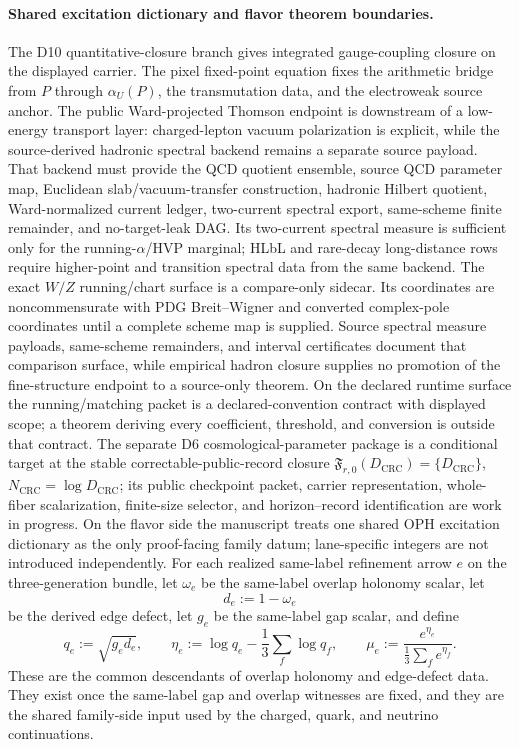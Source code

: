 \documentclass[11pt]{article}
\begin{document}
\paragraph{Shared excitation dictionary and flavor theorem boundaries.}
The D10 quantitative-closure branch gives integrated gauge-coupling closure on the displayed carrier. The pixel fixed-point equation fixes the arithmetic bridge from \(P\) through \(\alpha_U(P)\), the transmutation data, and the electroweak source anchor. The public Ward-projected Thomson endpoint is downstream of a low-energy transport layer: charged-lepton vacuum polarization is explicit, while the source-derived hadronic spectral backend remains a separate source payload. That backend must provide the QCD quotient ensemble, source QCD parameter map, Euclidean slab/vacuum-transfer construction, hadronic Hilbert quotient, Ward-normalized current ledger, two-current spectral export, same-scheme finite remainder, and no-target-leak DAG. Its two-current spectral measure is sufficient only for the running-\(\alpha\)/HVP marginal; HLbL and rare-decay long-distance rows require higher-point and transition spectral data from the same backend. The exact \(W/Z\) running/chart surface is a compare-only sidecar. Its coordinates are noncommensurate with PDG Breit--Wigner and converted complex-pole coordinates until a complete scheme map is supplied. Source spectral measure payloads, same-scheme remainders, and interval certificates document that comparison surface, while empirical hadron closure supplies no promotion of the fine-structure endpoint to a source-only theorem. On the declared runtime surface the running/matching packet is a declared-convention contract with displayed scope; a theorem deriving every coefficient, threshold, and conversion is outside that contract. The separate D6 cosmological-parameter package is a conditional target at the stable correctable-public-record closure \(\mathfrak F_{r,0}(D_{\mathrm{CRC}})=\{D_{\mathrm{CRC}}\}\), \(N_{\mathrm{CRC}}=\log D_{\mathrm{CRC}}\); its public checkpoint packet, carrier representation, whole-fiber scalarization, finite-size selector, and horizon--record identification are work in progress. On the flavor side the manuscript treats one shared OPH excitation dictionary as the only proof-facing family datum; lane-specific integers are not introduced independently. For each realized same-label refinement arrow \(e\) on the three-generation bundle, let \(\omega_e\) be the same-label overlap holonomy scalar, let
\[
d_e:=1-\omega_e
\]
be the derived edge defect, let \(g_e\) be the same-label gap scalar, and define
\[
q_e:=\sqrt{g_e d_e},
\qquad
\eta_e:=\log q_e-\frac13\sum_f \log q_f,
\qquad
\mu_e:=\frac{e^{\eta_e}}{\frac13\sum_f e^{\eta_f}}.
\]
These are the common descendants of overlap holonomy and edge-defect data. They exist once the same-label gap and overlap witnesses are fixed, and they are the shared family-side input used by the charged, quark, and neutrino continuations.
\end{document}
